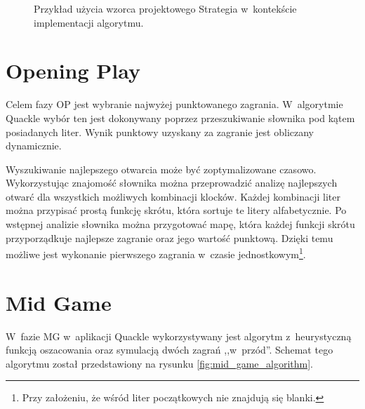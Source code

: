\documentclass[a4paper,twocolumn,12pt]{article}
\theoremstyle{definition}
\begin{document}
\begin{figure}[ht!]
	\centering
	\caption{Przykład użycia wzorca projektowego Strategia w~kontekście implementacji algorytmu.}
	\label{fig:strategy_pattern}
\end{figure}

\section*{Opening Play}

Celem fazy OP jest wybranie najwyżej punktowanego zagrania. W~algorytmie Quackle wybór ten jest dokonywany poprzez przeszukiwanie słownika pod kątem posiadanych liter. Wynik punktowy uzyskany za zagranie jest obliczany dynamicznie. 

Wyszukiwanie najlepszego otwarcia może być zoptymalizowane czasowo. Wykorzystując znajomość słownika można przeprowadzić analizę najlepszych otwarć dla wszystkich możliwych kombinacji klocków. Każdej kombinacji liter można przypisać prostą funkcję skrótu, która sortuje te litery alfabetycznie. Po wstępnej analizie słownika można przygotować mapę, która każdej funkcji skrótu przyporządkuje najlepsze zagranie oraz jego wartość punktową. Dzięki temu możliwe jest wykonanie pierwszego zagrania w~czasie jednostkowym\footnote{Przy założeniu, że wśród liter początkowych nie znajdują się blanki.}.

\section*{Mid Game}

W~fazie MG w~aplikacji Quackle wykorzystywany jest algorytm z~heurystyczną funkcją oszacowania oraz symulacją dwóch zagrań ,,w~przód''. Schemat tego algorytmu został przedstawiony na rysunku \ref{fig:mid_game_algorithm}.~\cite{quackle_algorithm}
\end{document}
